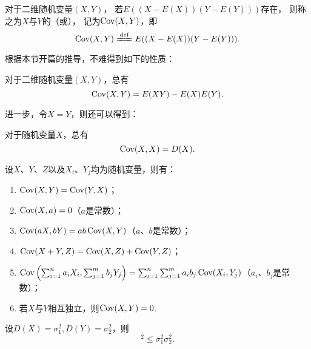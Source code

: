 \begin{definition}
对于二维随机变量\((X,Y)\)，
若\(E((X-E(X))(Y-E(Y)))\)存在，
则称之为\(X\)与\(Y\)的（或），
记为\(\operatorname{Cov}(X,Y)\)，即
\begin{equation}\label{equation:随机变量的数字特征.协方差的定义式}
    \Cov(X,Y) \defeq E((X-E(X))(Y-E(Y))).
\end{equation}
\end{definition}

根据本节开篇的推导，不难得到如下的性质：
\begin{property}\label{theorem:随机变量的数字特征.协方差的性质1}
对于二维随机变量\((X,Y)\)，总有
\begin{equation}\label{equation:随机变量的数字特征.协方差的计算式1}
    \operatorname{Cov}(X,Y) = E(XY) - E(X) E(Y).
\end{equation}
\end{property}

进一步，令\(X = Y\)，则还可以得到：
\begin{property}\label{theorem:随机变量的数字特征.协方差的性质2}
对于随机变量\(X\)，总有
\begin{equation}\label{equation:随机变量的数字特征.协方差与方差的联系1}
    \operatorname{Cov}(X,X) = D(X).
\end{equation}
\end{property}

\begin{property}\label{theorem:随机变量的数字特征.协方差的性质3}
设\(X\)、\(Y\)、\(Z\)以及\(X_i\)、\(Y_j\)均为随机变量，则有：
\begin{enumerate}
    \item \(\operatorname{Cov}(X,Y)=\operatorname{Cov}(Y,X)\)；
    \item \(\operatorname{Cov}(X,a)=0\)（\(a\)是常数）；
    \item \(\operatorname{Cov}(aX,bY)=ab\operatorname{Cov}(X,Y)\)（\(a\)、\(b\)是常数）；
    \item \(\operatorname{Cov}(X+Y,Z)=\operatorname{Cov}(X,Z)+\operatorname{Cov}(Y,Z)\)；
    \item \(\operatorname{Cov}\left(\sum_{i=1}^n{a_i X_i},\sum_{j=1}^m{b_j Y_j}\right)
    = \sum_{i=1}^n \sum_{j=1}^m {a_i b_j \operatorname{Cov}(X_i,Y_j)}\)（\(a_i\)、\(b_j\)是常数）；
    \item 若\(X\)与\(Y\)相互独立，则\(\operatorname{Cov}(X,Y)=0\).
\end{enumerate}
\end{property}

\begin{theorem}
设\(D(X) = \sigma_1^2, D(Y) = \sigma_2^2\)，则
\begin{equation}
    [\Cov(X,Y)]^2 \leq \sigma_1^2 \sigma_2^2.
\end{equation}
\end{theorem}

